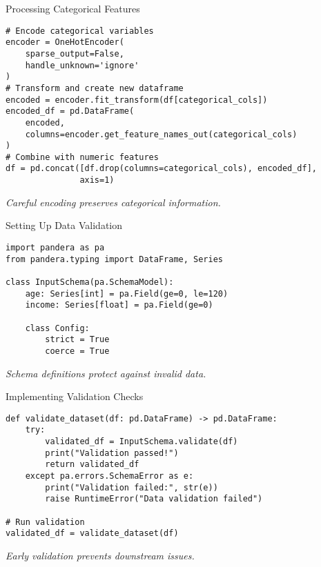 \documentclass[aspectratio=169]{beamer}
\begin{document}
\begin{frame}[fragile]{Processing Categorical Features}
\begin{verbatim}
# Encode categorical variables
encoder = OneHotEncoder(
    sparse_output=False,
    handle_unknown='ignore'
)
# Transform and create new dataframe
encoded = encoder.fit_transform(df[categorical_cols])
encoded_df = pd.DataFrame(
    encoded,
    columns=encoder.get_feature_names_out(categorical_cols)
)
# Combine with numeric features
df = pd.concat([df.drop(columns=categorical_cols), encoded_df],
               axis=1)
\end{verbatim}

\emph{Careful encoding preserves categorical information.}
\end{frame}


\begin{frame}[fragile]{Setting Up Data Validation}
\begin{verbatim}
import pandera as pa
from pandera.typing import DataFrame, Series

class InputSchema(pa.SchemaModel):
    age: Series[int] = pa.Field(ge=0, le=120)
    income: Series[float] = pa.Field(ge=0)

    class Config:
        strict = True
        coerce = True
\end{verbatim}

\emph{Schema definitions protect against invalid data.}
\end{frame}


\begin{frame}[fragile]{Implementing Validation Checks}
\begin{verbatim}
def validate_dataset(df: pd.DataFrame) -> pd.DataFrame:
    try:
        validated_df = InputSchema.validate(df)
        print("Validation passed!")
        return validated_df
    except pa.errors.SchemaError as e:
        print("Validation failed:", str(e))
        raise RuntimeError("Data validation failed")

# Run validation
validated_df = validate_dataset(df)
\end{verbatim}

\emph{Early validation prevents downstream issues.}
\end{frame}
\end{document}
